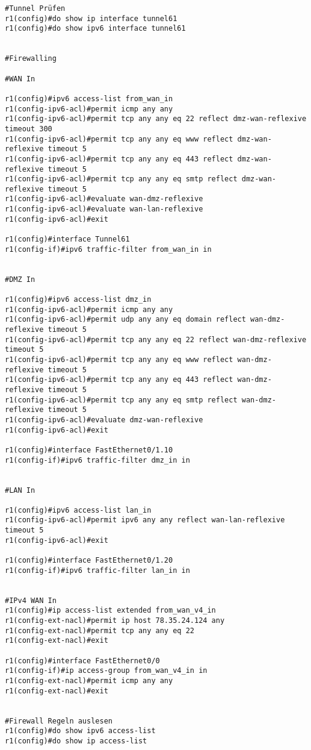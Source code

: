 \begin{lstlisting}[numbers=none]
#Tunnel Prüfen
r1(config)#do show ip interface tunnel61
r1(config)#do show ipv6 interface tunnel61


#Firewalling

#WAN In

r1(config)#ipv6 access-list from_wan_in
r1(config-ipv6-acl)#permit icmp any any
r1(config-ipv6-acl)#permit tcp any any eq 22 reflect dmz-wan-reflexive timeout 300
r1(config-ipv6-acl)#permit tcp any any eq www reflect dmz-wan-reflexive timeout 5
r1(config-ipv6-acl)#permit tcp any any eq 443 reflect dmz-wan-reflexive timeout 5
r1(config-ipv6-acl)#permit tcp any any eq smtp reflect dmz-wan-reflexive timeout 5
r1(config-ipv6-acl)#evaluate wan-dmz-reflexive
r1(config-ipv6-acl)#evaluate wan-lan-reflexive
r1(config-ipv6-acl)#exit

r1(config)#interface Tunnel61
r1(config-if)#ipv6 traffic-filter from_wan_in in


#DMZ In

r1(config)#ipv6 access-list dmz_in
r1(config-ipv6-acl)#permit icmp any any
r1(config-ipv6-acl)#permit udp any any eq domain reflect wan-dmz-reflexive timeout 5
r1(config-ipv6-acl)#permit tcp any any eq 22 reflect wan-dmz-reflexive timeout 5
r1(config-ipv6-acl)#permit tcp any any eq www reflect wan-dmz-reflexive timeout 5
r1(config-ipv6-acl)#permit tcp any any eq 443 reflect wan-dmz-reflexive timeout 5
r1(config-ipv6-acl)#permit tcp any any eq smtp reflect wan-dmz-reflexive timeout 5
r1(config-ipv6-acl)#evaluate dmz-wan-reflexive
r1(config-ipv6-acl)#exit

r1(config)#interface FastEthernet0/1.10
r1(config-if)#ipv6 traffic-filter dmz_in in


#LAN In

r1(config)#ipv6 access-list lan_in
r1(config-ipv6-acl)#permit ipv6 any any reflect wan-lan-reflexive timeout 5
r1(config-ipv6-acl)#exit

r1(config)#interface FastEthernet0/1.20
r1(config-if)#ipv6 traffic-filter lan_in in


#IPv4 WAN In
r1(config)#ip access-list extended from_wan_v4_in
r1(config-ext-nacl)#permit ip host 78.35.24.124 any
r1(config-ext-nacl)#permit tcp any any eq 22
r1(config-ext-nacl)#exit

r1(config)#interface FastEthernet0/0
r1(config-if)#ip access-group from_wan_v4_in in
r1(config-ext-nacl)#permit icmp any any
r1(config-ext-nacl)#exit


#Firewall Regeln auslesen
r1(config)#do show ipv6 access-list
r1(config)#do show ip access-list

\end{lstlisting}

